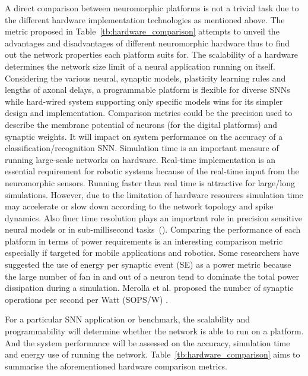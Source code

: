 A direct comparison between neuromorphic platforms is not a trivial task due to the different hardware implementation technologies as mentioned above.
The metric proposed in Table~\ref{tb:hardware_comparison} attempts to unveil the advantages and disadvantages of different neuromorphic hardware thus to find out the network properties each platform suits for.
The scalability of a hardware determines the network size limit of a neural application running on itself.
Considering the various neural, synaptic models, plasticity learning rules and lengths of axonal delays, a programmable platform is flexible for diverse SNNs while hard-wired system supporting only specific models wins for its simpler design and implementation.
Comparison metrics could be the precision used to describe the membrane potential of neurons (for the digital platforms) and synaptic weights.
It will impact on system performance on the accuracy of a classification/recognition SNN.
Simulation time is an important measure of running large-scale networks on hardware.
Real-time implementation is an essential requirement for robotic systems because of the real-time input from the neuromorphic sensors.
Running faster than real time is attractive for large/long simulations.
However, due to the limitation of hardware resources simulation time may accelerate or slow down according to the network topology and spike dynamics.
Also finer time resolution plays an important role in precision sensitive neural models or in sub-millisecond tasks~(\cite{lagorce2015breaking}).
Comparing the performance of each platform in terms of power requirements is an interesting comparison metric especially if targeted for mobile applications and robotics. Some researchers have suggested the use of energy per synaptic event (SE) \citep{Sharp2012110,strometal} as a power metric because the large number of fan in and out of a neuron tend to dominate the total power dissipation during a simulation. Merolla et al. proposed the number of synaptic operations per second per Watt (SOPS/W) \citep{Merolla08082014}. 

For a particular SNN application or benchmark, the scalability and programmability will determine whether the network is able to run on a platform.
And the system performance will be assessed on the accuracy, simulation time and energy use of running the network. 
Table~\ref{tb:hardware_comparison} aims to summarise the aforementioned hardware comparison metrics.
 

